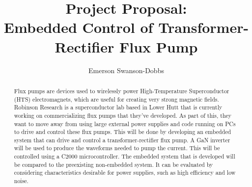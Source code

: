 \documentclass[11pt, a4paper, twoside, openright]{article}
\title{Project Proposal:\\ Embedded Control of Transformer-Rectifier Flux Pump}
\author{Emerson Swanson-Dobbs}
\date{}
\begin{document}
\frontmatter


\begin{abstract}
Flux pumps are devices used to wirelessly power High-Temperature Superconductor (HTS) electromagnets, which are useful for creating very strong magnetic fields. Robinson Research is a superconductor lab based in Lower Hutt that is currently working on commercializing flux pumps that they've developed. As part of this, they want to move away from using large external power supplies and code running on PCs to drive and control these flux pumps. This will be done by developing an embedded system that can drive and control a transformer-rectifier flux pump. A GaN inverter will be used to produce the waveforms needed to pump the current. This will be controlled using a C2000 microcontroller. The embedded system that is developed will be compared to the preexisting non-embedded system. It can be evaluated by considering characteristics desirable for power supplies, such as high efficiency and low noise.

\end{abstract}


\maketitle




\mainmatter
\end{document}
